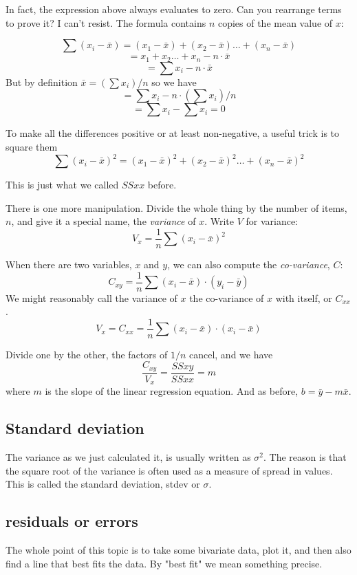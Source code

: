 \documentclass[11pt, oneside]{article}
\begin{document}
In fact, the expression above always evaluates to zero.  Can you rearrange terms to prove it?  I can't resist.  The formula contains $n$ copies of the mean value of $x$:

\[ \sum (x_i - \bar{x}) = (x_1 - \bar{x}) + (x_2 - \bar{x}) \dots + (x_n - \bar{x}) \]
\[ = x_1 + x_2 \dots + x_n - n \cdot \bar{x} \]
\[ = \sum x_i - n \cdot \bar{x} \]
But by definition $\bar{x} = (\sum x_i)/n$ so we have
\[ = \sum x_i - n \cdot (\sum x_i)/n \]
\[ = \sum x_i - \sum x_i  = 0 \]

To make all the differences positive or at least non-negative, a useful trick is to square them
\[ \sum (x_i - \bar{x})^2 = (x_1 - \bar{x})^2 + (x_2 - \bar{x})^2 \dots + (x_n - \bar{x})^2  \]

This is just what we called $SSxx$ before.

There is one more manipulation.  Divide the whole thing by the number of items, $n$, and give it a special name, the \emph{variance} of $x$.  Write $V$ for variance:
\[ V_x = \frac{1}{n} \sum (x_i - \bar{x})^2 \]

When there are two variables, $x$ and $y$, we can also compute the \emph{co-variance}, $C$:
\[ C_{xy} = \frac{1}{n} \sum (x_i - \bar{x}) \cdot (y_i - \bar{y})  \]
We might reasonably call the variance of $x$ the co-variance of $x$ with itself, or $C_{xx}$.
\[ V_x = C_{xx} = \frac{1}{n} \sum (x_i - \bar{x}) \cdot (x_i - \bar{x}) \]

Divide one by the other, the factors of $1/n$ cancel, and we have
\[ \frac{C_{xy}}{V_x} = \frac{SSxy}{SSxx} = m \]
where $m$ is the slope of the linear regression equation.  And as before, $b = \bar{y} - m \bar{x}$.

\subsection*{Standard deviation}

The variance as we just calculated it, is usually written as $\sigma^2$.  The reason is that the square root of the variance is often used as a measure of spread in values.  This is called the standard deviation, stdev or $\sigma$.

\subsection*{residuals or errors}
The whole point of this topic is to take some bivariate data, plot it, and then also find a line that best fits the data.  By "best fit" we mean something precise.  
\end{document}
